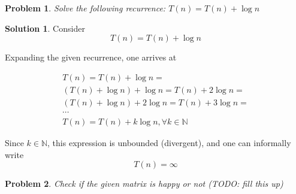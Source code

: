 \documentclass{article}
\newtheorem{problem}{Problem}
\theoremstyle{definition}
\newtheorem*{solution}{Solution}
\begin{document}
\begin{problem}
Solve the following recurrence: $T(n)=T(n)+\log n$
\end{problem}
\begin{solution}
	Consider 
	$$
	T(n) = T(n) + \log n
	$$
	
	Expanding the given recurrence, one arrives at 
	
	\begin{gather*}
		T(n) = T(n) + \log n = \\
		(T(n) + \log n) + \log n = T(n) + 2 \log n = \\
		(T(n) + \log n) + 2 \log n = T(n) + 3 \log n = \\
		\cdots \\
		T(n) = T(n) + k \log n, \forall k \in \mathbb N
	\end{gather*}
	
	Since $k \in \mathbb N$, this expression is unbounded (divergent), and one can
	informally write
	$$
	T(n) = \infty
	$$
\end{solution}

\begin{problem}
Check if the given matrix is happy or not (TODO: fill this up)
\end{problem}
\end{document}
